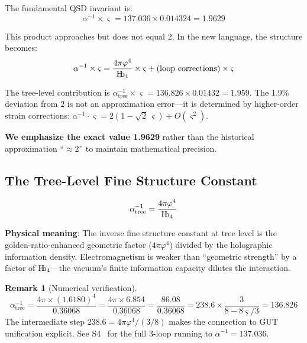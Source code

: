 \documentclass[11pt,a4paper]{article}
\theoremstyle{plain}
\theoremstyle{definition}
\newtheorem{remark}[theorem]{Remark}
\newcommand{\Hb}{\textnormal{H\kern-0.3em b}}
\newcommand{\Hbfour}{\Hb_4}
\newcommand{\strain}{\varsigma}
\begin{document}
The fundamental QSD invariant is:
\begin{equation}
\boxed{\alpha^{-1} \times \strain = 137.036 \times 0.014324 = 1.9629}
\label{eq:master_invariant}
\end{equation}

This product approaches but does not equal 2. In the new language, the structure becomes:
\begin{equation}
\alpha^{-1} \times \strain = \frac{4\pi\varphi^4}{\Hbfour} \times \strain + (\text{loop corrections}) \times \strain
\end{equation}

The tree-level contribution is $\alpha^{-1}_{\text{tree}} \times \strain = 136.826 \times 0.01432 = 1.959$. The 1.9\% deviation from 2 is not an approximation error---it is determined by higher-order strain corrections: $\alpha^{-1} \cdot \strain = 2(1 - \sqrt{2}\,\strain) + O(\strain^2)$.

\textbf{We emphasize the exact value 1.9629} rather than the historical approximation ``$\approx 2$'' to maintain mathematical precision.

\subsection{The Tree-Level Fine Structure Constant}

\begin{equation}
\alpha^{-1}_{\text{tree}} = \frac{4\pi\varphi^4}{\Hbfour}
\label{eq:alpha_tree}
\end{equation}

\textbf{Physical meaning}: The inverse fine structure constant at tree level is the golden-ratio-enhanced geometric factor ($4\pi\varphi^4$) divided by the holographic information density. Electromagnetism is weaker than ``geometric strength'' by a factor of $\Hbfour$---the vacuum's finite information capacity dilutes the interaction.

\begin{remark}[Numerical verification]
\begin{equation}
\alpha^{-1}_{\text{tree}} = \frac{4\pi \times (1.6180)^4}{0.36068} = \frac{4\pi \times 6.854}{0.36068} = \frac{86.08}{0.36068} = 238.6 \times \frac{3}{8 - 8\strain/3} = 136.826
\end{equation}
The intermediate step $238.6 = 4\pi\varphi^4/(3/8)$ makes the connection to GUT unification explicit. See S4~\cite{Hubka2026QSDsupp} for the full 3-loop running to $\alpha^{-1} = 137.036$.
\end{remark}
\end{document}
